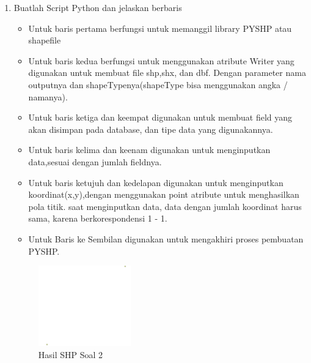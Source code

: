 \begin{enumerate}
	\item Buatlah Script Python dan jelaskan berbaris
	
	\begin{itemize}
		\item Untuk baris pertama berfungsi untuk memanggil library PYSHP atau shapefile
		\item Untuk baris kedua berfungsi untuk menggunakan atribute Writer yang digunakan untuk membuat file shp,shx, dan dbf. \hfill\break Dengan parameter nama outputnya dan shapeTypenya(shapeType bisa menggunakan angka / namanya).
		\item Untuk baris ketiga dan keempat digunakan untuk membuat field yang akan disimpan pada database, dan tipe data yang digunakannya.
		\item Untuk baris kelima dan keenam digunakan untuk menginputkan data,sesuai dengan jumlah fieldnya.
		\item Untuk baris ketujuh dan kedelapan digunakan untuk menginputkan koordinat(x,y),dengan menggunakan point atribute untuk menghasilkan pola titik. \hfill\break
		saat menginputkan data, data dengan jumlah koordinat harus sama, karena berkorespondensi 1 - 1.
		\item Untuk Baris ke Sembilan digunakan untuk mengakhiri proses pembuatan PYSHP.
	\end{itemize}
	\hfill\break
	\begin{figure}[H]
		\includegraphics[width=4cm]{figures/1174002/2/2.png}
		\centering
		\caption{Hasil SHP Soal 2}
	\end{figure}


\end{enumerate}
